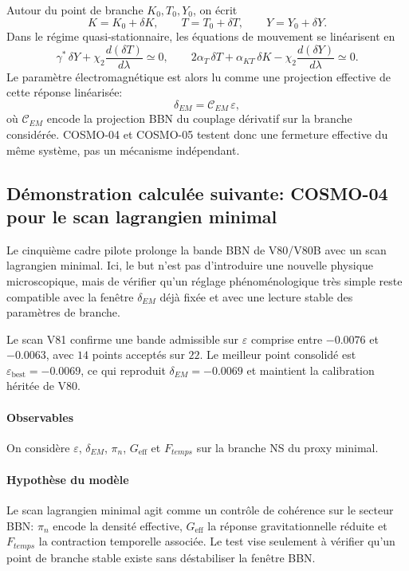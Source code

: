 \documentclass[11pt,a4paper]{article}
\begin{document}
Autour du point de branche $K_0,T_0,Y_0$, on écrit
\[
K=K_0+\delta K,\qquad T=T_0+\delta T,\qquad Y=Y_0+\delta Y.
\]
Dans le régime quasi-stationnaire, les équations de mouvement se linéarisent en
\[
\gamma^*\,\delta Y+\chi_2\frac{d(\delta T)}{d\lambda}\simeq 0,
\qquad
2\alpha_T\,\delta T+\alpha_{KT}\,\delta K-\chi_2\frac{d(\delta Y)}{d\lambda}\simeq 0.
\]
Le paramètre électromagnétique est alors lu comme une projection effective de cette réponse linéarisée:
\[
\delta_{EM}=\mathcal{C}_{EM}\,\varepsilon,
\]
où $\mathcal{C}_{EM}$ encode la projection BBN du couplage dérivatif sur la branche considérée. COSMO-04 et COSMO-05 testent donc une fermeture effective du même système, pas un mécanisme indépendant.

\subsection{Démonstration calculée suivante: COSMO-04 pour le scan lagrangien minimal}
Le cinquième cadre pilote prolonge la bande BBN de V80/V80B avec un scan lagrangien minimal. Ici, le but n'est pas d'introduire une nouvelle physique microscopique, mais de vérifier qu'un réglage phénoménologique très simple reste compatible avec la fenêtre $\delta_{EM}$ déjà fixée et avec une lecture stable des paramètres de branche.

Le scan V81 confirme une bande admissible sur $\varepsilon$ comprise entre $-0.0076$ et $-0.0063$, avec $14$ points acceptés sur $22$. Le meilleur point consolidé est $\varepsilon_{\mathrm{best}}=-0.0069$, ce qui reproduit $\delta_{EM}=-0.0069$ et maintient la calibration héritée de V80.

\paragraph{Observables}
On considère $\varepsilon$, $\delta_{EM}$, $\pi_n$, $G_{\mathrm{eff}}$ et $F_{temps}$ sur la branche NS du proxy minimal.

\paragraph{Hypothèse du modèle}
Le scan lagrangien minimal agit comme un contrôle de cohérence sur le secteur BBN: $\pi_n$ encode la densité effective, $G_{\mathrm{eff}}$ la réponse gravitationnelle réduite et $F_{temps}$ la contraction temporelle associée. Le test vise seulement à vérifier qu'un point de branche stable existe sans déstabiliser la fenêtre BBN.
\end{document}
